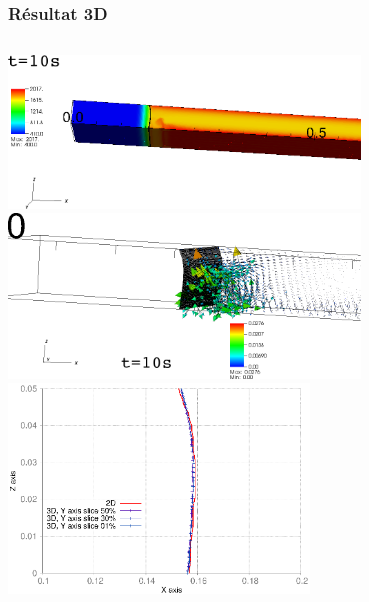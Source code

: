 \documentclass{beamer}
\begin{document}
\begin{frame}
    \frametitle{Résultat 3D}
    \scriptsize


\begin{columns}[c]
    \begin{column}{0.5 \textwidth}
\begin{center}
   \includegraphics[width=0.7\textwidth]{./Figures/10s_TEMP0000.png}\\
	\hspace{-0.8cm}
\includegraphics[width=0.7\textwidth]{./Figures/10s_VIT0000.png}\\
\includegraphics[width=0.6\textwidth]{./Figures/PositionInterface3D_10s.eps}



\end{center}
\end{column}
\end{columns}
\end{frame}
\end{document}
